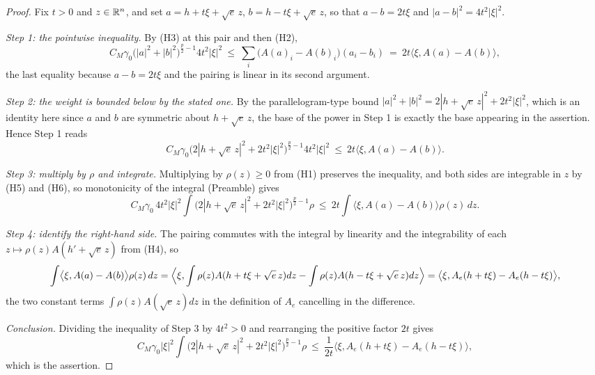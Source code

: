 \begin{proof}
Fix $t>0$ and $z\in\mathbb{R}^n$, and set
$a=h+t\xi+\sqrt e\,z$, $b=h-t\xi+\sqrt e\,z$, so that $a-b=2t\xi$ and
$|a-b|^2=4t^2|\xi|^2$.

\emph{Step 1: the pointwise inequality.}  By (H3) at this pair and then (H2),
\[
C_M\gamma_0\bigl(|a|^2+|b|^2\bigr)^{\frac p2-1}4t^2|\xi|^2
\ \le\ \sum_i\bigl(A(a)_i-A(b)_i\bigr)(a_i-b_i)
\ =\ 2t\bigl\langle\xi,A(a)-A(b)\bigr\rangle ,
\]
the last equality because $a-b=2t\xi$ and the pairing is linear in its second
argument.

\emph{Step 2: the weight is bounded below by the stated one.}  By the
parallelogram-type bound
$|a|^2+|b|^2=2|h+\sqrt e\,z|^2+2t^2|\xi|^2$, which is an identity here since
$a$ and $b$ are symmetric about $h+\sqrt e\,z$, the base of the power in Step 1
is exactly the base appearing in the assertion.  Hence Step 1 reads
\[
C_M\gamma_0\bigl(2|h+\sqrt e\,z|^2+2t^2|\xi|^2\bigr)^{\frac p2-1}4t^2|\xi|^2
\ \le\ 2t\bigl\langle\xi,A(a)-A(b)\bigr\rangle .
\]

\emph{Step 3: multiply by $\rho$ and integrate.}  Multiplying by $\rho(z)\ge0$
from (H1) preserves the inequality, and both sides are integrable in $z$ by
(H5) and (H6), so monotonicity of the integral (Preamble) gives
\[
C_M\gamma_0\,4t^2|\xi|^2\!\int\bigl(2|h+\sqrt e\,z|^2+2t^2|\xi|^2\bigr)^{\frac p2-1}\rho
\ \le\ 2t\!\int\bigl\langle\xi,A(a)-A(b)\bigr\rangle\rho(z)\,dz .
\]

\emph{Step 4: identify the right-hand side.}  The pairing commutes with the
integral by linearity and the integrability of each
$z\mapsto\rho(z)A(h'+\sqrt e\,z)$ from (H4), so
\[
\int\bigl\langle\xi,A(a)-A(b)\bigr\rangle\rho(z)\,dz
=\Bigl\langle\xi,\int\rho(z)A(h+t\xi+\sqrt e\,z)dz-\int\rho(z)A(h-t\xi+\sqrt e\,z)dz\Bigr\rangle
=\bigl\langle\xi,A_e(h+t\xi)-A_e(h-t\xi)\bigr\rangle,
\]
the two constant terms $\int\rho(z)A(\sqrt e\,z)dz$ in the definition of $A_e$
cancelling in the difference.

\emph{Conclusion.}  Dividing the inequality of Step 3 by $4t^2>0$ and
rearranging the positive factor $2t$ gives
\[
C_M\gamma_0|\xi|^2\!\int\bigl(2|h+\sqrt e\,z|^2+2t^2|\xi|^2\bigr)^{\frac p2-1}\rho
\ \le\ \frac1{2t}\bigl\langle\xi,A_e(h+t\xi)-A_e(h-t\xi)\bigr\rangle,
\]
which is the assertion.
\end{proof}
